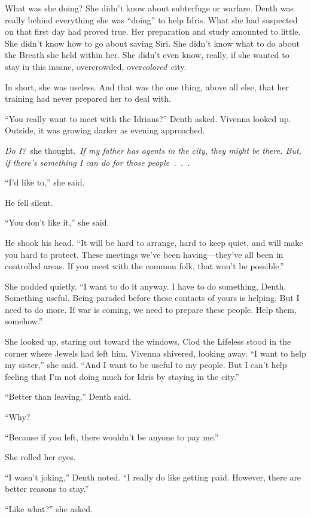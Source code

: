 What was she doing? She didn’t know about subterfuge or warfare. Denth was really behind everything she was “doing” to help Idris. What she had suspected on that first day had proved true. Her preparation and study amounted to little. She didn’t know how to go about saving Siri. She didn’t know what to do about the Breath she held within her. She didn’t even know, really, if she wanted to stay in this insane, overcrowded, over\textit{colored}~city.

In short, she was useless. And that was the one thing, above all else, that her training had never prepared her to deal with.

“You really want to meet with the Idrians?” Denth asked. Vivenna looked up. Outside, it was growing darker as evening approached.

\textit{Do I?}~she thought.~\textit{If my father has agents in the city, they might be there. But, if there’s something I can do for those people~.~.~.}

“I’d like to,” she said.

He fell silent.

“You don’t like it,” she said.

He shook his head. “It will be hard to arrange, hard to keep quiet, and will make you hard to protect. These meetings we’ve been having—they’ve all been in controlled areas. If you meet with the common folk, that won’t be possible.”

She nodded quietly. “I want to do it anyway. I have to do something, Denth. Something useful. Being paraded before these contacts of yours is helping. But I need to do more. If war is coming, we need to prepare these people. Help them, somehow.”

She looked up, staring out toward the windows. Clod the Lifeless stood in the corner where Jewels had left him. Vivenna shivered, looking away. “I want to help my sister,” she said. “And I want to be useful to my people. But I can’t help feeling that I’m not doing much for Idris by staying in the city.”

“Better than leaving,” Denth said.

“Why?

“Because if you left, there wouldn’t be anyone to pay me.”

She rolled her eyes.

“I wasn’t joking,” Denth noted. “I really do like getting paid. However, there are better reasons to stay.”

“Like what?” she asked.

